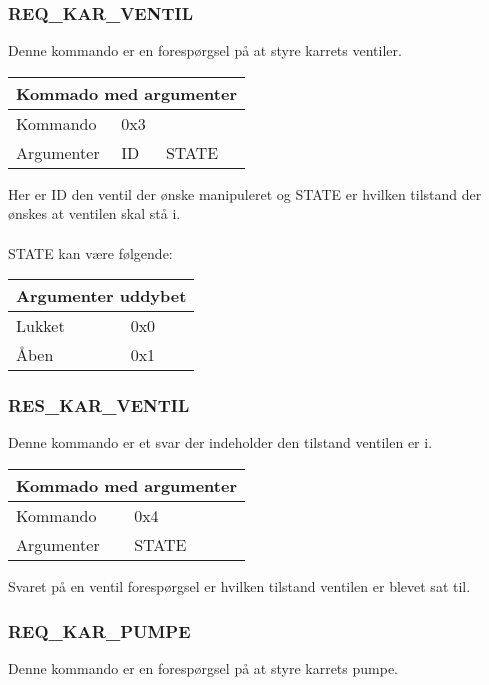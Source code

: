 \subsubsection{REQ\_KAR\_VENTIL}
Denne kommando er en forespørgsel på at styre karrets ventiler.

\begin{table}[H]
\setlength{\parindent}{12pt}
\begin{tabular}{|l|lcc|}
\hline
\multicolumn{4}{|c|}{Kommado med argumenter}\\\hline
Kommando & 0x3 & & \\
Argumenter & ID & STATE & \\\hline
\end{tabular}
\end{table}

Her er ID den ventil der ønske manipuleret og STATE er hvilken tilstand der ønskes at ventilen skal stå i.\\\\
STATE kan være følgende:
\begin{table}[H]
\setlength{\parindent}{12pt}
\begin{tabular}{|l|l|}
\hline
\multicolumn{2}{|c|}{Argumenter uddybet}\\\hline
Lukket & 0x0 \\
Åben & 0x1 \\\hline
\end{tabular}
\end{table}

\subsubsection{RES\_KAR\_VENTIL}
Denne kommando er et svar der indeholder den tilstand ventilen er i.

\begin{table}[H]
\setlength{\parindent}{12pt}
\begin{tabular}{|l|lcc|}
\hline
\multicolumn{4}{|c|}{Kommado med argumenter}\\\hline
Kommando & 0x4 & & \\
Argumenter & STATE & & \\\hline
\end{tabular}
\end{table}

Svaret på en ventil forespørgsel er hvilken tilstand ventilen er blevet sat til.

\subsubsection{REQ\_KAR\_PUMPE}
Denne kommando er en forespørgsel på at styre karrets pumpe.

